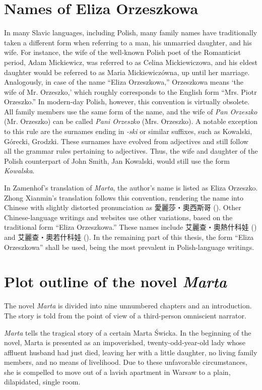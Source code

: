 \section{Names of Eliza Orzeszkowa}
In many Slavic languages, including Polish, many family names have traditionally taken a different form when referring to a man, his unmarried daughter, and his wife.
For instance, the wife of the well-known Polish poet of the Romanticist period, Adam Mickiewicz, was referred to as Celina Mickiewiczowa, and his eldest daughter would be referred to as Maria Mickiewiczówna, up until her marriage.
Analogously, in case of the name ``Eliza Orzeszkowa,'' Orzeszkowa means `the wife of Mr. Orzeszko,' which roughly corresponds to the English form ``Mrs. Piotr Orzeszko.''
In modern-day Polish, however, this convention is virtually obsolete.
All family members use the same form of the name, and the wife of \textit{Pan Orzeszko} (Mr. Orzeszko) can be called \textit{Pani Orzeszko} (Mrs. Orzeszko).
A notable exception to this rule are the surnames ending in \textit{-ski} or similar suffixes, such as Kowalski, Górecki, Grodzki.
These surnames have evolved from adjectives and still follow all the grammar rules pertaining to adjectives.
Thus, the wife and daughter of the Polish counterpart of John Smith, Jan Kowalski, would still use the form \textit{Kowalska}. 

In Zamenhof's translation of \textit{Marta}, the author's name is listed as Eliza Orzeszko.
Zhong Xianmin's translation follows this convention, rendering the name into Chinese with slightly distorted pronunciation as 愛麗莎・奧西斯哥 ().
Other Chinese-language writings and websites use other variations, based on the traditional form ``Eliza Orzeszkowa.''
These names include 艾麗查・奧熱什科娃 () and 艾麗查・奧若什科娃 (). In the remaining part of this thesis, the form ``Eliza Orzeszkowa'' shall be used, being the most prevalent in Polish-language writings.

\section{Plot outline of the novel \textit{Marta}}
The novel \textit{Marta} is divided into nine unnumbered chapters and an introduction. 
The story is told from the point of view of a third-person omniscient narrator.

\textit{Marta} tells the tragical story of a certain Marta Świcka.
In the beginning of the novel, Marta is presented as an impoverished, twenty-odd-year-old lady whose affluent husband had just died, leaving her with a little daughter, no living family members, and no means of livelihood.
Due to these unfavorable circumstances, she is compelled to move out of a lavish apartment in Warsaw to a plain, dilapidated, single room.


